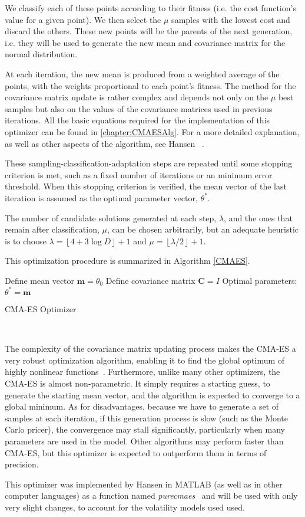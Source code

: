 We classify each of these points according to their fitness (i.e. the cost function's value for a given point). We then select the $\mu$ samples with the lowest cost and discard the others. These new points will be the parents of the next generation, i.e. they will be used to generate the new mean and covariance matrix for the normal distribution.



At each iteration, the new mean is produced from a weighted average of the points, with the weights proportional to each point's fitness.
The method for the covariance matrix update is rather complex and depends not only on the $\mu$ best samples but also on the values of the covariance matrices used in previous iterations. All the basic equations required for the implementation of this optimizer can be found in \autoref{chapter:CMAESAlg}. For a more detailed explanation, as well as other aspects of the algorithm, see Hansen ~\citep{Hansen}.

These sampling-classification-adaptation steps are repeated until some stopping criterion is met, such as a fixed number of iterations or an minimum error threshold.
When this stopping criterion is verified, the mean vector of the last iteration is assumed as the optimal parameter vector, $\theta^{*}$.


The number of candidate solutions generated at each step, $\lambda$, and the ones that remain after classification, $\mu$, can be chosen arbitrarily, but an adequate heuristic is to choose $\lambda=\left\lfloor4+3\log D\right\rfloor+1$ and $\mu=\left\lfloor\lambda/2\right\rfloor+1$.

This optimization procedure is summarized in Algorithm \ref{CMAES}.

\begin{algorithm}[H]\label{CMAES}
\DontPrintSemicolon
Define mean vector $\mathbf{m}=\theta_0$
Define covariance matrix $\mathbf{C}=I$\;
 Optimal parameters: $\theta^{*}=\mathbf{m}$\;
 \caption{CMA-ES Optimizer}
\end{algorithm}
\

The complexity of the covariance matrix updating process makes the CMA-ES a very robust optimization algorithm, enabling it to find the global optimum of highly nonlinear functions~\citep{DilaoCMA}.
Furthermore, unlike many other optimizers, the CMA-ES is almost non-parametric. It simply requires a starting guess, to generate the starting mean vector, and the algorithm is expected to converge to a global minimum.
As for disadvantages, because we have to generate a set of samples at each iteration, if this generation process is slow (such as the Monte Carlo pricer), the convergence may stall significantly, particularly when many parameters are used in the model. Other algorithms may perform faster than CMA-ES, but this optimizer is expected to outperform them in terms of precision.

This optimizer was implemented by Hansen in MATLAB (as well as in other computer languages) as a function named \emph{purecmaes}~\citep{CMAES} and will be used with only very slight changes, to account for the volatility models used used.

